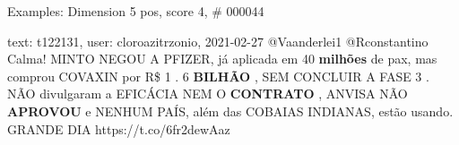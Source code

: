 \begin{frame}{Examples: Dimension 5 pos, score 4, \# 000044}
\footnotesize
\begin{exampleblock}{text: t122131, user: cloroazitrzonio, 2021-02-27}
@Vaanderlei1 @Rconstantino Calma! MINTO NEGOU A PFIZER, já aplicada em 40 
\textbf{milhões} de pax, mas comprou COVAXIN por R\$ 1 . 6 \textbf{BILHÃO} , 
SEM CONCLUIR A FASE 3 . NÃO divulgaram a EFICÁCIA NEM O \textbf{CONTRATO} , 
ANVISA NÃO \textbf{APROVOU} e NENHUM PAÍS, além das COBAIAS INDIANAS, estão 
usando. GRANDE DIA  
https://t.co/6fr2dewAaz 
\end{exampleblock}
\end{frame}
